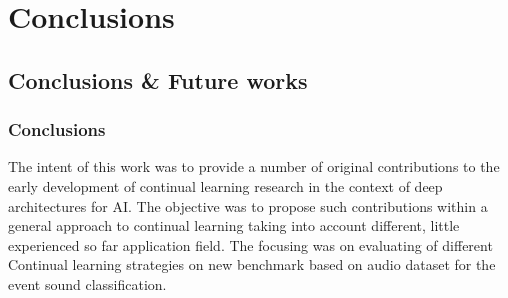 \documentclass[english, LaM, oneside]{sapthesis}%
\begin{document}
\part{Conclusions}


\chapter{Conclusions \& Future works}

\section{Conclusions}
The intent of this work was to provide a number of original contributions to the early development of continual learning research in the context of deep architectures for AI. The objective was to propose such contributions within a general approach to continual learning taking into account different, little experienced so far application field. The focusing was on evaluating of different Continual learning strategies on new benchmark based on audio dataset for the event sound classification.
\end{document}
